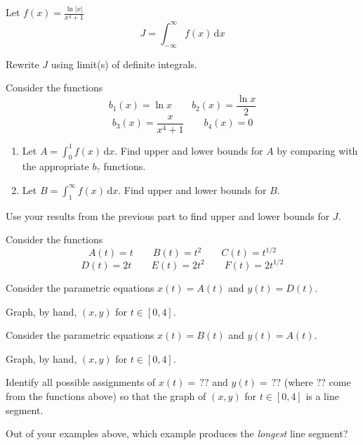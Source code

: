 \documentclass{workbook}
\begin{document}
\begin{slide}
	\question

	Let $\displaystyle f(x)=\frac{\ln|x|}{x^4+1}$
	\[
	J=\int_{-\infty}^\infty f(x)\,\mathrm d x
	\]

	\begin{parts}
		\item Rewrite $J$ using limit(s) of definite integrals.
		\item 
		Consider the functions
		\[
			b_1(x)=\ln x \qquad b_2(x)=\frac{\ln x}{2}
		\]
		\[
			b_3(x) = \frac{x}{x^4+1}\qquad b_4(x)=0
		\]
		\begin{enumerate}
		\item Let $A=\displaystyle \int_0^1 f(x)\,\mathrm d x$.
		Find upper and lower bounds for $A$ by comparing with the
		appropriate $b_?$ 
		functions.

		\item Let $B=\displaystyle \int_1^\infty f(x)\,\mathrm d x$.
		Find upper and lower bounds for $B$.

		\end{enumerate}
		
		\item Use your results from the previous part to find upper and lower bounds for $J$.
		
	\end{parts}
\end{slide}

\begin{slide}
	\question

	Consider the functions
	\[
		A(t)=t \qquad B(t)=t^2 \qquad C(t)=t^{1/2}
	\]
	\[
		D(t)=2t \qquad E(t)=2t^2 \qquad F(t)=2t^{1/2}
	\]

	\begin{parts}
		\item Consider the parametric equations $x(t)=A(t)$ and $y(t)=D(t)$.

		Graph, by hand, $(x,y)$ for $t\in [0,4]$.

		\item Consider the parametric equations $x(t)=B(t)$ and $y(t)=A(t)$.

		Graph, by hand, $(x,y)$ for $t\in [0,4]$.

		\item Identify all possible assignments of $x(t)=\,??$ and $y(t)=\,??$ 
		(where $??$ come from the functions above) so that 
		the graph of $(x,y)$ for $t\in [0,4]$ is a line segment.

		\item Out of your examples above, which example produces the \emph{longest} line segment?
		
	\end{parts}
\end{slide}
\end{document}
